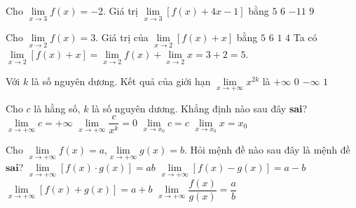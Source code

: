 \begin{ex}%
	Cho $\displaystyle\lim\limits_{x \to 3} f(x) =-2$. Giá trị $\displaystyle\lim\limits_{x \to 3} \left[f(x)+4x-1\right]$ bằng
	\choice
	{$5$}
	{$6$}
	{$-11$}
	{\True $9$}
\end{ex}


\begin{ex}%
	Cho $\lim\limits_{x\to 2}f(x)=3$. Giá trị của $\lim\limits_{x \to 2}\left[f(x)+x\right]$ bằng
	\choice
	{\True $5$}
	{$6$}
	{$1$}
	{$4$}
	\loigiai
	{
		Ta có $\lim\limits_{x \to 2}\left[f(x)+x\right] = \lim\limits_{x \to 2}f(x) + \lim\limits_{x \to 2}x = 3+2=5$.
	}
\end{ex}


\begin{ex}%
	Với $k$ là số nguyên dương. Kết quả của giới hạn $\lim\limits_{x\to+\infty}x^{2k}$ là
	\choice
	{\True $+\infty$}
	{$0$}
	{$-\infty$}
	{$1$}
\end{ex}


\begin{ex}%
	Cho $c$ là hằng số, $k$ là số nguyên dương. Khẳng định nào sau đây \textbf{sai}?	
	\choice
	{\True $\lim\limits_{ x \rightarrow +\infty}c=+\infty$}
	{$\lim\limits_{ x \rightarrow +\infty}\dfrac{c}{x^k}=0$}
	{$\lim\limits_{ x \rightarrow x_0}c=c$}
	{$\lim\limits_{ x \rightarrow x_0}x=x_0$}
\end{ex}


\begin{ex}%
	Cho $\lim\limits_{x \to +\infty} f(x)=a$,$\lim\limits_{x \to +\infty} g(x)=b$. Hỏi mệnh đề nào sau đây là mệnh đề $\textbf{sai}$?
	\choice
	{$\lim\limits_{x \to +\infty} \left[f(x)\cdot g(x)\right]=ab$}
	{$\lim\limits_{x \to +\infty} \left[f(x)- g(x)\right]=a-b$}
	{$\lim\limits_{x \to +\infty} \left[f(x)+ g(x)\right]=a+b$}
	{$\lim\limits_{x \to +\infty} \dfrac{f(x)}{g(x)}=\dfrac{a}{b}$}
\end{ex}


